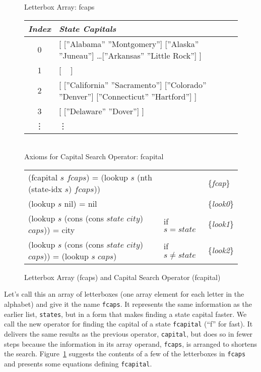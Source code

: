 \begin{figure}
\begin{center}
Letterbox Array: fcaps
\begin{tabular}{c|l}
\emph{Index} &\emph{State Capitals} \\
\hline
0 & [ [''Alabama''  ''Montgomery''] [''Alaska''   ''Juneau''] \dots [''Arkansas''  ''Little Rock''] ]  \\ %
1 & [ ~ ]\\
2 & [ [''California''  ''Sacramento''] [''Colorado''  ''Denver''] [''Connecticut''  ''Hartford''] ]\\
3 & [ [''Delaware''  ''Dover''] ]\\
\vdots & \hspace*{15mm}\vdots\\
\end{tabular}
\vspace{2mm}\\
Axioms for Capital Search Operator: fcapital\\
\begin{tabular}{lll}
(fcapital $s$ $fcaps$) = (lookup $s$ (nth (state-idx $s$) $fcaps$)) && \{\emph{fcap}\} \\
(lookup $s$ nil) = nil  && \{\emph{look0}\}     \\
(lookup $s$ (cons (cons $state$ $city$) $caps$)) = city &if $s = state$ & \{\emph{look1}\} \\
(lookup $s$ (cons (cons $state$ $city$) $caps$)) = (lookup $s$ $caps$) &if $s \ne state$ & \{\emph{look2}\} \\
\end{tabular}
\end{center}
\caption{Letterbox Array (fcaps) and Capital Search Operator (fcapital)}
\label{fig:fcaps-array}
\end{figure}

Let's call this an array of letterboxes
(one array element for each letter in the alphabet)
and give it the name \texttt{fcaps}.
It represents the same information as the earlier list, \texttt{states},
but in a form that makes finding a state capital faster.
We call the new operator for finding the capital of a state
\texttt{fcapital} (``f'' for fast).
It delivers the same results
as the previous operator, \texttt{capital},
but does so in fewer steps because the information in its array operand,
\texttt{fcaps}, is arranged to shortens the search.
Figure~\ref{fig:fcaps-array} suggests the contents of a few
of the letterboxes in \texttt{fcaps} and presents some
equations defining \texttt{fcapital}.

